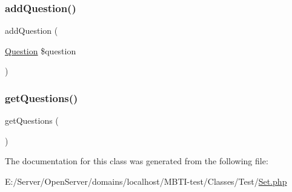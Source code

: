 \subsubsection{\texorpdfstring{add\+Question()}{addQuestion()}}
{\footnotesize\ttfamily add\+Question (\begin{DoxyParamCaption}\item[{\hyperlink{class_classes_1_1_test_1_1_question}{Question}}]{\$question }\end{DoxyParamCaption})}

\mbox{\label{class_classes_1_1_test_1_1_set_aa5473162875f6946182770047be563d7}} 
\subsubsection{\texorpdfstring{get\+Questions()}{getQuestions()}}
{\footnotesize\ttfamily get\+Questions (\begin{DoxyParamCaption}{ }\end{DoxyParamCaption})}



The documentation for this class was generated from the following file\+:\begin{DoxyCompactItemize}
\item 
E\+:/\+Server/\+Open\+Server/domains/localhost/\+M\+B\+T\+I-\/test/\+Classes/\+Test/\hyperlink{_set_8php}{Set.\+php}\end{DoxyCompactItemize}
